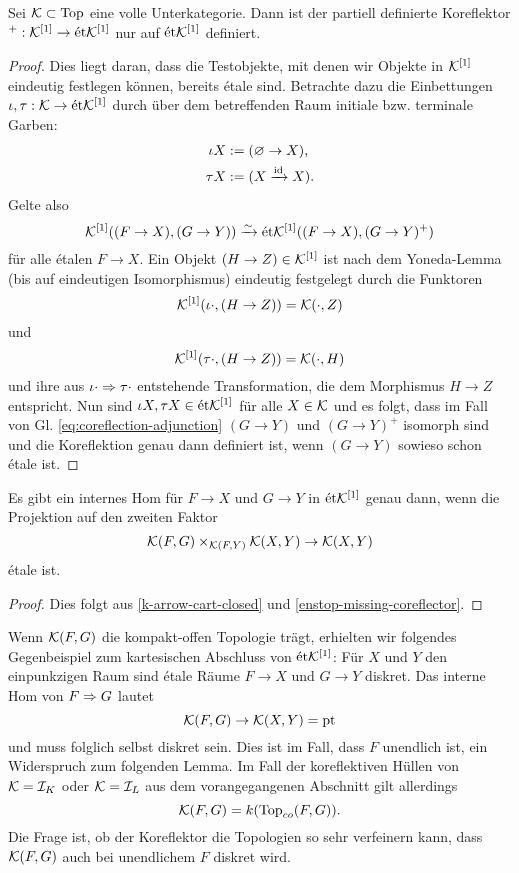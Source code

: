 \begin{satz} \label{enstop-missing-coreflector}
  Sei $\mathcal{K} \subset \operatorname{Top}$ eine volle Unterkategorie. Dann ist der
  partiell definierte Koreflektor $^+: \mathcal{K}^{[1]} \to \mathrm{\acute{e}t} \mathcal{K}^{[1]}$ nur
  auf $\mathrm{\acute{e}t} \mathcal{K}^{[1]}$ definiert.
\end{satz}
\begin{proof}
  Dies liegt daran, dass die Testobjekte, mit denen wir Objekte in
  $\mathcal{K}^{[1]}$ eindeutig festlegen können, bereits étale sind. Betrachte
  dazu die Einbettungen $\iota, \tau: \mathcal{K} \to \mathrm{\acute{e}t} \mathcal{K}^{[1]}$ durch über
  dem betreffenden Raum initiale bzw. terminale Garben:
  \begin{align*}
    \iota X &:= (\varnothing \to X), \\
    \tau X &:= (X \xrightarrow{\operatorname{id}} X).
  \end{align*}
  Gelte also
  \begin{equation} \label{eq:coreflection-adjunction}
    \mathcal{K}^{[1]}((F \to X), (G \to Y)) \xrightarrow[]{\sim} \mathrm{\acute{e}t} \mathcal{K}^{[1]}((F \to X), (G \to Y)^+)
  \end{equation}
  für alle étalen $F \to X$. Ein Objekt $(H \to Z) \in \mathcal{K}^{[1]}$ ist
  nach dem Yoneda-Lemma (bis auf eindeutigen Isomorphismus) eindeutig
  festgelegt durch die Funktoren
  \[ \mathcal{K}^{[1]}(\iota \cdot, (H \to Z)) = \mathcal{K}(\cdot, Z) \]
  und
  \[ \mathcal{K}^{[1]}(\tau \cdot, (H \to Z)) = \mathcal{K}(\cdot, H) \]
  und ihre aus $\iota \cdot \Rightarrow \tau \cdot$ entstehende
  Transformation, die dem Morphismus $H \to Z$ entspricht. Nun sind
  $\iota X, \tau X \in \mathrm{\acute{e}t} \mathcal{K}^{[1]}$ für alle $X \in \mathcal{K}$ und es folgt,
  dass im Fall von Gl. \ref{eq:coreflection-adjunction} $(G \to Y)$
  und $(G \to Y)^+$ isomorph sind und die Koreflektion genau dann
  definiert ist, wenn $(G \to Y)$ sowieso schon étale ist.
\end{proof}
\begin{kor}
  Es gibt ein internes Hom für $F \to X$ und $G \to Y$ in $\mathrm{\acute{e}t}
  \mathcal{K}^{[1]}$ genau dann, wenn die Projektion auf den zweiten Faktor
  \[ \mathcal{K}(F, G) \times_{\mathcal{K}(F, Y)} \mathcal{K}(X, Y) \to \mathcal{K}(X, Y) \]
  étale ist.
\end{kor}
\begin{proof}
  Dies folgt aus \ref{k-arrow-cart-closed} und
  \ref{enstop-missing-coreflector}.
\end{proof}
\begin{bem}
  Wenn $\mathcal{K}(F, G)$ die kompakt-offen Topologie trägt, erhielten wir
  folgendes Gegenbeispiel zum kartesischen Abschluss von $\mathrm{\acute{e}t}
  \mathcal{K}^{[1]}$: Für $X$ und $Y$ den einpunkzigen Raum sind étale Räume $F
  \to X$ und $G \to Y$ diskret. Das interne Hom von $F \Rightarrow G$ lautet
  \[ \mathcal{K}(F, G) \to \mathcal{K}(X, Y) = \operatorname{pt} \]
  und muss folglich selbst diskret sein. Dies ist im Fall, dass $F$
  unendlich ist, ein Widerspruch zum folgenden Lemma. Im Fall der
  koreflektiven Hüllen von $\mathcal{K} = \mathcal{I}_K$ oder $\mathcal{K} =
  \mathcal{I}_L$ aus dem vorangegangenen Abschnitt gilt allerdings
  \[ \mathcal{K}(F, G) = k(\operatorname{Top}_{co}(F, G)) . \]
  Die Frage ist, ob der Koreflektor die Topologien so sehr verfeinern
  kann, dass $\mathcal{K}(F, G)$ auch bei unendlichem $F$ diskret wird.
\end{bem}
